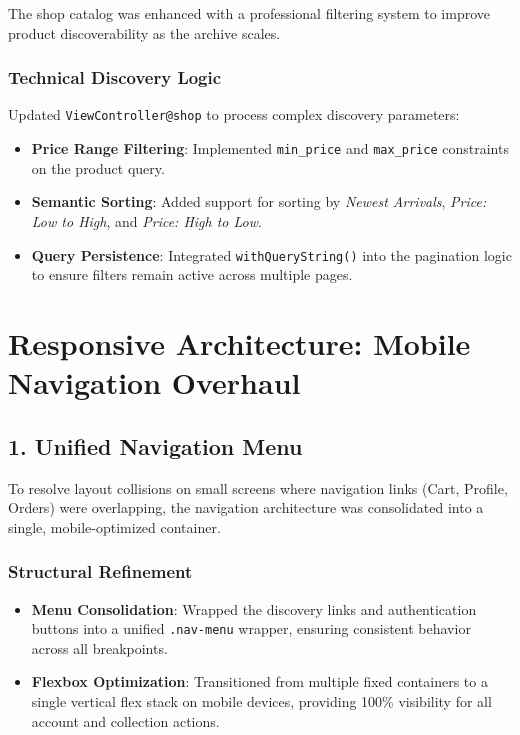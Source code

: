 \documentclass[12pt,a4paper]{article}
\begin{document}
The shop catalog was enhanced with a professional filtering system to improve product discoverability as the archive scales.

\subsubsection{Technical Discovery Logic}
Updated \texttt{ViewController@shop} to process complex discovery parameters:
\begin{itemize}
    \item \textbf{Price Range Filtering}: Implemented \texttt{min\_price} and \texttt{max\_price} constraints on the product query.
    \item \textbf{Semantic Sorting}: Added support for sorting by \textit{Newest Arrivals}, \textit{Price: Low to High}, and \textit{Price: High to Low}.
    \item \textbf{Query Persistence}: Integrated \texttt{withQueryString()} into the pagination logic to ensure filters remain active across multiple pages.
\end{itemize}

\section{Responsive Architecture: Mobile Navigation Overhaul}

\subsection{1. Unified Navigation Menu}

To resolve layout collisions on small screens where navigation links (Cart, Profile, Orders) were overlapping, the navigation architecture was consolidated into a single, mobile-optimized container.

\subsubsection{Structural Refinement}
\begin{itemize}
    \item \textbf{Menu Consolidation}: Wrapped the discovery links and authentication buttons into a unified \texttt{.nav-menu} wrapper, ensuring consistent behavior across all breakpoints.
    \item \textbf{Flexbox Optimization}: Transitioned from multiple fixed containers to a single vertical flex stack on mobile devices, providing 100\% visibility for all account and collection actions.
\end{itemize}
\end{document}
